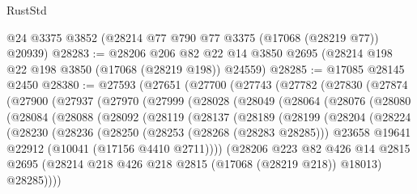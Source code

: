 \begin{lexlean}{RustStd}
\begin{coremodule}
    @24
    @3375
    @3852
    (@28214 @77 @790 @77 @3375 (@17068 (@28219 @77)) @20939)
@28283 := @28206
    @206
    @82
    @22
    @14
    @3850
    @2695
    (@28214 @198 @22 @198 @3850 (@17068 (@28219 @198)) @24559)
@28285 := @17085 @28145 @2450
@28380 := @27593
    (@27651
      (@27700
        (@27743
          (@27782
            (@27830
              (@27874
                (@27900
                  (@27937
                    (@27970
                      (@27999
                        (@28028
                          (@28049
                            (@28064
                              (@28076
                                (@28080
                                  (@28084
                                    (@28088
                                      (@28092
                                        (@28119
                                          (@28137
                                            (@28189
                                              (@28199
                                                (@28204
                                                  (@28224
                                                    (@28230
                                                      (@28236
                                                        (@28250
                                                          (@28253 (@28268 (@28283 @28285)))
                                                          @23658
                                                          @19641
                                                          @22912
                                                          (@10041 (@17156 @4410 @2711))))
                                                      (@28206
                                                        @223
                                                        @82
                                                        @426
                                                        @14
                                                        @2815
                                                        @2695
                                                        (@28214
                                                          @218
                                                          @426
                                                          @218
                                                          @2815
                                                          (@17068 (@28219 @218))
                                                          @18013)
                                                        @28285))))

\end{coremodule}
\end{lexlean}
